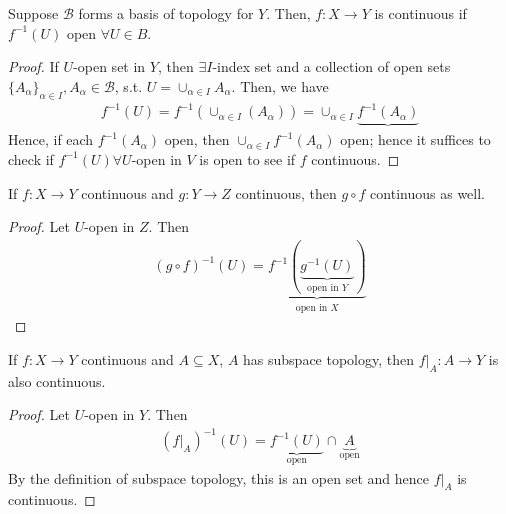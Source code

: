 \begin{proposition}
    Suppose $\mathcal{B}$ forms a basis of topology for $Y$. Then, $f: X \to Y$ is continuous if $f^{-1}(U)$ open $\forall U \in B$.
\end{proposition}

\begin{proof}
    If $U$-open set in $Y$, then $\exists I$-index set and a collection of open sets $\{A_\alpha\}_{\alpha \in I}, A_\alpha \in \mathcal{B}$, s.t. $U = \cup_{\alpha \in I}A_\alpha$. Then, we have \begin{align*}
        f^{-1}(U) = f^{-1}(\cup_{\alpha \in I}(A_\alpha)) = \cup_{\alpha \in I}\underbrace{f^{-1}(A_\alpha)}
    \end{align*}
    Hence, if each $f^{-1}(A_{\alpha})$ open, then $\cup_{\alpha \in I} f^{-1}(A_{\alpha})$ open; hence it suffices to check if $f^{-1}(U) \forall U$-open in $V$ is open to see if $f$ continuous.
\end{proof}

\begin{theorem}
    If $f: X \to Y$ continuous and $g : Y \to Z$ continuous, then $g \circ f$ continuous as well.
\end{theorem}

\begin{proof}
    Let $U$-open in $Z$. Then \begin{align*}
        (g \circ f)^{-1}(U) = \underbrace{f^{-1}(\underbrace{g^{-1}(U)}_{\text{open in }Y})}_{\text{open in }X}
    \end{align*}
\end{proof}

\begin{proposition}
    If $f: X \to Y$ continuous and $A \subseteq X$, $A$ has subspace topology, then $f|_A : A \to Y$ is also continuous.\footnotemark
\end{proposition}


\begin{proof}
    Let $U$-open in $Y$. Then \begin{align*}
        (f|_A)^{-1}(U) = \underbrace{f^{-1}(U)}_{\text{open}}\cap \underbrace{A}_{\text{open}}
    \end{align*}
    By the definition of subspace topology, this is an open set and hence $f|_A$ is continuous.
\end{proof}

